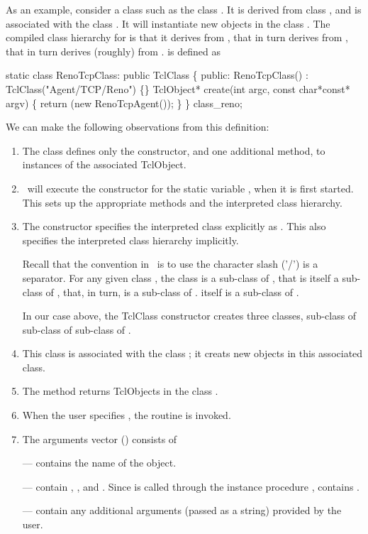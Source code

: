 As an example, consider a class such as the
class .
It is derived from class , and
is associated with the class .
It will instantiate new objects in the class .
The compiled class hierarchy for  is that
it derives from , that in turn derives from ,
that in turn derives (roughly) from .
 is defined as
\begin{program}
        static class RenoTcpClass: public TclClass \{
        public:
                RenoTcpClass() : TclClass("Agent/TCP/Reno") \{\}
                TclObject* create(int argc, const char*const* argv) \{
                        return (new RenoTcpAgent());
                \}
        \} class_reno;
\end{program}
We can make the following observations from this definition:
\begin{enumerate}
\item The class defines only the constructor, and one additional method,
  to  instances of the associated TclObject.
\item \ns\ will execute the  constructor
  for the static variable , when it is first started.
  This sets up the appropriate methods and the interpreted class hierarchy.
\item The constructor specifies the interpreted class explicitly as
  .  This also specifies the interpreted class
  hierarchy implicitly.

  Recall that the convention in \ns\ is to use
  the character slash ('/') is a separator.
  For any given class ,
  the class  is a sub-class of ,
  that is itself a sub-class of ,
  that, in turn, is a sub-class of .
   itself is a sub-class of .

  In our case above, the TclClass constructor creates three classes,
   sub-class of 
  sub-class of  sub-class of .
\item This class is associated with the class ;
  it creats new objects in this associated class.
\item The  method returns TclObjects in the
  class .
\item When the user specifies ,
  the routine  is invoked.
\item The arguments vector () consists of

  ---  contains the name of the object.

  ---  contain
  , , and .%
  Since  is called
  through the instance procedure ,
   contains .

  --- 
  contain any additional arguments (passed as a string) provided by the user.
\end{enumerate}
